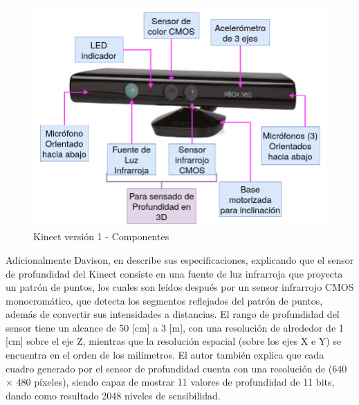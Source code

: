             \begin{figure}[H]
                \centering
                \includegraphics[scale=0.3]{Figures/Kinect_parts.png}
                    \caption{Kinect versión 1 - Componentes}
                    \label{fig:Kinect_Parts}
            \end{figure}

            Adicionalmente Davison, en \cite{davison_kinect_2012} describe sus especificaciones, explicando que el sensor de profundidad del Kinect consiste en una fuente de luz infrarroja que proyecta un patrón de puntos, los cuales son leídos después por un sensor infrarrojo CMOS monocromático, que detecta los segmentos reflejados del patrón de puntos, además de convertir sus intensidades a distancias. El rango de profundidad del sensor tiene un alcance de 50 [cm] a 3 [m], con una resolución de alrededor de 1 [cm] sobre el eje Z, mientras que la resolución espacial (sobre los ejes X e Y) se encuentra en el orden de los milímetros. El autor también explica que cada cuadro generado por el sensor de profundidad cuenta con una resolución de (640 $\times$ 480 píxeles), siendo capaz de mostrar 11 valores de profundidad de 11 bits, dando como resultado 2048 niveles de sensibilidad.  

